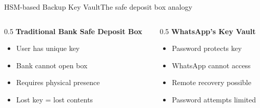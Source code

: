 \ifdefined\PRESENTATION\else\PassOptionsToClass{handout}{beamer}\fi\documentclass[aspectratio=169, lualatex]{beamer}
\begin{document}
\begin{frame}{HSM-based Backup Key Vault}{The safe deposit box analogy}
	\begin{columns}[c]
		\begin{column}{0.5\textwidth}
			\textbf{Traditional Bank Safe Deposit Box}
			\begin{itemize}
				\item User has unique key
				\item Bank cannot open box
				\item Requires physical presence
				\item Lost key = lost contents
			\end{itemize}
		\end{column}
		\begin{column}{0.5\textwidth}
			\textbf{WhatsApp's Key Vault}
			\begin{itemize}
				\item Password protects key
				\item WhatsApp cannot access
				\item Remote recovery possible
				\item Password attempts limited
			\end{itemize}
		\end{column}
	\end{columns}
\end{frame}
\end{document}
